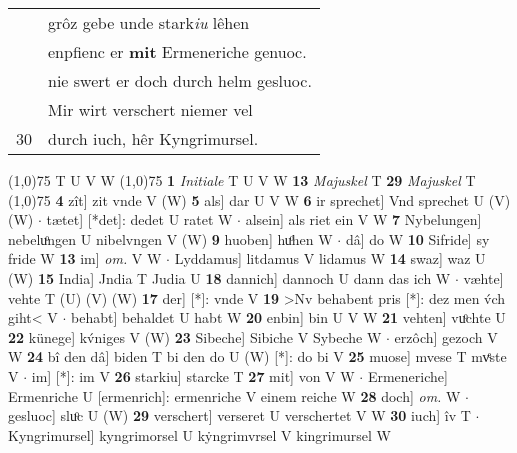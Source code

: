 \documentclass[8pt,a4paper,notitlepage]{article}
\begin{document}
\begin{table}[ht]
\begin{minipage}[t]{0.5\linewidth}
\begin{tabular}{rl}
 & grôz gebe unde stark\textit{iu} lêhen\\ 
 & enpfienc er \textbf{mit} Ermeneriche genuoc.\\ 
 & nie swert er doch durch helm gesluoc.\\ 
 & Mir wirt verschert niemer vel\\ 
30 & durch iuch, hêr Kyngrimursel.\\ 
\end{tabular}
\scriptsize
\line(1,0){75} \newline
T U V W \newline
\line(1,0){75} \newline
\textbf{1} \textit{Initiale} T U V W  \textbf{13} \textit{Majuskel} T  \textbf{29} \textit{Majuskel} T  \newline
\line(1,0){75} \newline
\textbf{4} zît] zit vnde V (W) \textbf{5} als] dar U V W \textbf{6} ir sprechet] Vnd sprechet U (V) (W)  $\cdot$ tætet] [*det]: dedet U ratet W  $\cdot$ alsein] als riet ein V W \textbf{7} Nybelungen] nebeluͦngen U nibelvngen V (W) \textbf{9} huoben] huͦhen W  $\cdot$ dâ] do W \textbf{10} Sifride] sy fride W \textbf{13} im] \textit{om.} V W  $\cdot$ Lyddamus] litdamus V lidamus W \textbf{14} swaz] waz U (W) \textbf{15} India] Jndia T Judia U \textbf{18} dannich] dannoch U dann das ich W  $\cdot$ væhte] vehte T (U) (V) (W) \textbf{17} der] [*]: vnde V \textbf{19} >Nv behabent pris [*]: dez men v́ch giht< V  $\cdot$ behabt] behaldet U habt W \textbf{20} enbin] bin U V W \textbf{21} vehten] vuͦchte U \textbf{22} künege] kv́niges V (W) \textbf{23} Sibeche] Sibiche V Sybeche W  $\cdot$ erzôch] gezoch V W \textbf{24} bî den dâ] biden T bi den do U (W) [*]: do bi  V \textbf{25} muose] mvese T mvͤste V  $\cdot$ im] [*]: im V \textbf{26} starkiu] starcke T \textbf{27} mit] von V W  $\cdot$ Ermeneriche] Ermenriche U [ermenrich]: ermenriche V einem reiche W \textbf{28} doch] \textit{om.} W  $\cdot$ gesluoc] sluͦc U (W) \textbf{29} verschert] verseret U verschertet V W \textbf{30} iuch] îv T  $\cdot$ Kyngrimursel] kyngrimorsel U kẏngrimvrsel V kingrimursel W \newline
\end{minipage}
\end{table}
\end{document}
